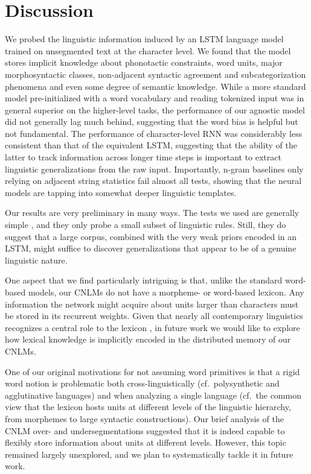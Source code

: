 \section{Discussion}
\label{sec:discussion}

We probed the linguistic information induced by an LSTM language model
trained on unsegmented text at the character level. We found that the
model stores implicit knowledge about phonotactic constraints, word
units, major morphosyntactic classes, non-adjacent syntactic agreement
and subcategorization phenomena and even some degree of semantic
knowledge. While a more standard model pre-initialized with a word
vocabulary and reading tokenized input was in general superior on the
higher-level tasks, the performance of our agnostic model did not
generally lag much behind, suggesting that the word bias is helpful
but not fundamental. The performance of character-level RNN was
considerably less consistent than that of the equivalent LSTM, suggesting that
the ability of the latter to track information across longer time
steps is important to extract linguistic generalizations from the raw
input. Importantly, n-gram baselines only relying on adjacent string
statistics fail almost all tests, showing that the neural models
are tapping into somewhat deeper linguistic templates.

Our results are very preliminary in many ways. The tests we used are
generally simple \cite[we did not attempt, for example, to model
long-distance subject-verb agreement, a task that is challenging even
for word-based models:][]{Linzen:etal:2016}, and they only probe a
small subset of linguistic rules. Still, they do suggest that a large
corpus, combined with the very weak priors encoded in an LSTM, might
suffice to discover generalizations that appear to be of a genuine
linguistic nature.

One aspect that we find particularly intriguing is that, unlike the
standard word-based models, our CNLMs do not have a morpheme- or
word-based lexicon. Any information the network might acquire about
units larger than characters must be stored in its recurrent
weights. Given that nearly all contemporary linguistics recognizes a
central role to the lexicon \cite[see, e.g.,][for different
perspectives]{Sag:etal:2003,Goldberg:2005,Radford:2006,Bresnan:etal:2016,Jezek:2016},
in future work we would like to explore how lexical knowledge is
implicitly encoded in the distributed memory of our CNLMs.

One of our original motivations for not assuming word primitives is that a rigid word notion is problematic both cross-linguistically (cf.~polysynthetic and agglutinative languages) and when analyzing a single language (cf.~the common  view  that the lexicon hosts units at different levels of the linguistic hierarchy, from  morphemes to large syntactic constructions). Our brief analysis of the CNLM over- and undersegmentations suggested that it is indeed capable to flexibly store information about units at different levels. However, this topic  remained largely unexplored, and we plan to systematically tackle it in future work.

